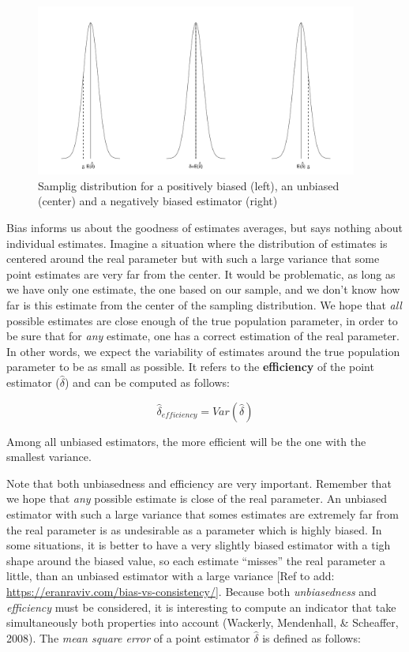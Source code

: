 \documentclass[man]{apa6}
\begin{document}
\begin{figure}
\includegraphics[width=400px]{ES_files/figure-latex/BIAS-1} \caption{Samplig distribution for a positively biased (left), an unbiased (center) and a negatively biased estimator (right)}\label{fig:BIAS}
\end{figure}

Bias informs us about the goodness of estimates averages, but says nothing about individual estimates. Imagine a situation where the distribution of estimates is centered around the real parameter but with such a large variance that some point estimates are very far from the center. It would be problematic, as long as we have only one estimate, the one based on our sample, and we don't know how far is this estimate from the center of the sampling distribution. We hope that \emph{all} possible estimates are close enough of the true population parameter, in order to be sure that for \emph{any} estimate, one has a correct estimation of the real parameter. In other words, we expect the variability of estimates around the true population parameter to be as small as possible. It refers to the \textbf{efficiency} of the point estimator (\(\hat{\delta}\)) and can be computed as follows:

\begin{equation} 
\hat{\delta}_{efficiency}=Var(\hat{\delta})
\label{eq:EFFICIENCY}
\end{equation}

Among all unbiased estimators, the more efficient will be the one with the smallest variance.

Note that both unbiasedness and efficiency are very important. Remember that we hope that \emph{any} possible estimate is close of the real parameter. An unbiased estimator with such a large variance that somes estimates are extremely far from the real parameter is as undesirable as a parameter which is highly biased. In some situations, it is better to have a very slightly biased estimator with a tigh shape around the biased value, so each estimate \enquote{misses} the real parameter a little, than an unbiased estimator with a large variance {[}Ref to add: \url{https://eranraviv.com/bias-vs-consistency/}{]}. Because both \emph{unbiasedness} and \emph{efficiency} must be considered, it is interesting to compute an indicator that take simultaneously both properties into account (Wackerly, Mendenhall, \& Scheaffer, 2008). The \emph{mean square error} of a point estimator \(\hat{\delta}\) is defined as follows:
\end{document}
